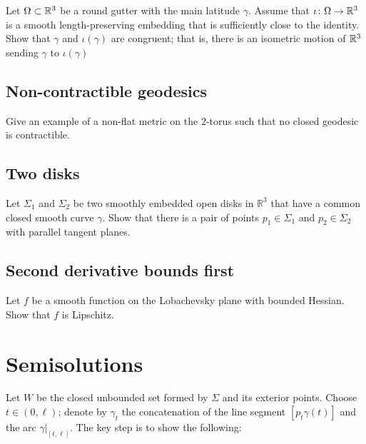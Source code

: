 \begin{pr}
Let $\Omega\subset \mathbb{R}^3$ be a round gutter with the main latitude $\gamma$. 
Assume that $\iota\:\Omega\z\to\RR^3$ 
is a smooth length-preserving embedding that is sufficiently close to the identity.
Show that $\gamma$ and $\iota(\gamma)$ are congruent;
that is, there is an isometric motion of $\mathbb{R}^3$ sending $\gamma$ to $\iota(\gamma)$
\end{pr}



\subsection*{Non-contractible geodesics}
\label{torus}

\begin{pr}
Give an example of a non-flat metric 
on the $2$-torus such that no closed geodesic is contractible.
\end{pr}


\subsection*{Two disks}
\label{Two disks}

\begin{pr}
Let $\Sigma_1$ and $\Sigma_2$ be two smoothly embedded open disks in $\mathbb R^3$ 
that have a common closed smooth curve $\gamma$.
Show that there is a pair of points  $p_1\in \Sigma_1$ and $p_2\in \Sigma_2$ with parallel tangent planes.
\end{pr}

\subsection*{Second derivative bounds first\easy}
\label{Second derivative bounds first}

\begin{pr}
Let $f$ be a smooth function on the Lobachevsky plane with bounded Hessian.
Show that $f$ is Lipschitz.
\end{pr}


\section*{Semisolutions}
Let $W$ be the closed unbounded set formed by $\Sigma$ and its exterior points.
Choose $t\in (0,\ell)$;
denote by $\gamma_t$ the concatenation of the line segment $[p_t\gamma(t)]$ and the arc $\gamma|_{[t,\ell]}$.
The key step is to show the following:

